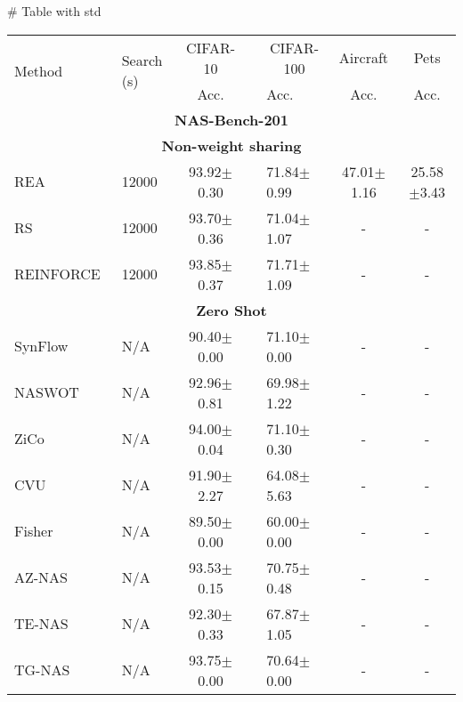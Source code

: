 # Table with std
            \begin{table*}
                \centering
                \begin{adjustbox}{width=1.3\columnwidth,center}
                \begin{tabular}{@{}llcllcc@{}} \hline 
                \multirow{2}{*}{Method} & \multirow{2}{*}{Search (s)}  & \multicolumn{1}{c}{CIFAR-10} & \phantom{ab} & \multicolumn{1}{c}{CIFAR-100} & \multicolumn{1}{c}{Aircraft} & \multicolumn{1}{c}{Pets} \\
                \cmidrule{3-3} \cmidrule{5-7}
                & & Acc. && Acc. & Acc. & Acc. \\
                \midrule
                \multicolumn{7}{c}{\textbf{NAS-Bench-201}} \\
                \midrule
                \multicolumn{7}{c}{\textbf{Non-weight sharing}}\\
                REA~\cite{real2019regularized}       &  12000 & 93.92$\pm$0.30 && 71.84$\pm$0.99 & 47.01$\pm$1.16 & 25.58$\pm$3.43 \\
                RS~\cite{bergstra2012random}        &  12000 & 93.70$\pm$0.36 && 71.04$\pm$1.07 & - & - \\
                REINFORCE~\cite{williams1992simple} &  12000 & 93.85$\pm$0.37 && 71.71$\pm$1.09 & - & - \\
                \midrule
                \multicolumn{7}{c}{\textbf{Zero Shot}}\\
                SynFlow~\cite{tanaka2020pruning}   & N/A    & 90.40$\pm$0.00 && 71.10$\pm$0.00 & - & - \\
                NASWOT~\cite{mellor2021neural}     & N/A    & 92.96$\pm$0.81 && 69.98$\pm$1.22 & - & - \\
                ZiCo~\cite{ye2022decoupling}       & N/A    & 94.00$\pm$0.04 && 71.10$\pm$0.30 & - & - \\
                CVU~\cite{g@article}            & N/A    & 91.90$\pm$2.27 && 64.08$\pm$5.63 & - & - \\
                Fisher~\cite{trasatti2022neural}   & N/A    & 89.50$\pm$0.00 && 60.00$\pm$0.00 & - & - \\
                AZ-NAS~\cite{zennas_iccv_2021}     & N/A    & 93.53$\pm$0.15 && 70.75$\pm$0.48 & - & - \\
                TE-NAS~\cite{chen2021tenas}        & N/A    & 92.30$\pm$0.33 && 67.87$\pm$1.05 & - & - \\
                TG-NAS~\cite{shi2021benchmarking}  & N/A    & 93.75$\pm$0.00 && 70.64$\pm$0.00 & - & - \\

\end{tabular}
\end{adjustbox}
\end{table*}
